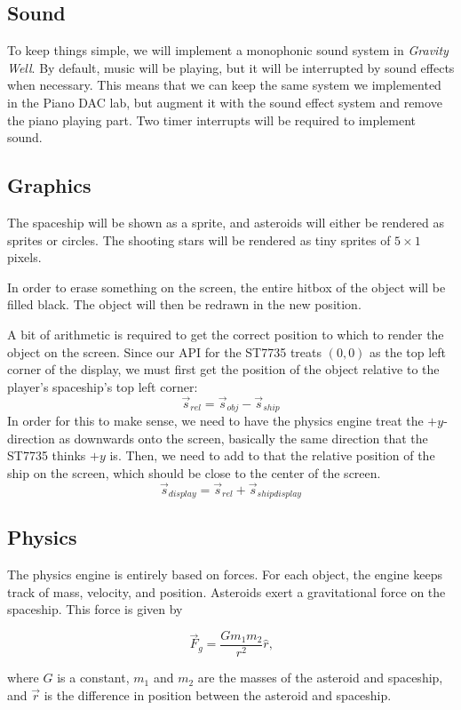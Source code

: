 \documentclass{article}
\def\gamename{Gravity Well}
\def\gametin{\textit{\gamename}}
\begin{document}
\subsection{Sound}

To keep things simple, we will implement a monophonic sound system in \gametin. By default, music will be playing, but
it will be interrupted by sound effects when necessary. This means that we can keep the same system we implemented in the
Piano DAC lab, but augment it with the sound effect system and remove the piano playing part. Two timer interrupts
will be required to implement sound.

\subsection{Graphics}

The spaceship will be shown as a sprite, and asteroids will either be rendered as sprites or circles. The shooting stars
will be rendered as tiny sprites of $5\times1$ pixels.

In order to erase something on the screen, the entire hitbox of the object will be filled black. The object will then be
redrawn in the new position.

A bit of arithmetic is required to get the correct position to which to render the object on the screen. Since our API
for the ST7735 treats $(0,0)$ as the top left corner of the display, we must first get the position of the object relative
to the player's spaceship's top left corner:
$$\vec s_{rel} = \vec s_{obj} - \vec s_{ship}$$
In order for this to make sense, we need to have the physics engine treat the $+y$-direction as downwards onto the screen,
basically the same direction that the ST7735 thinks $+y$ is.
Then, we need to add to that the relative position of the ship on the screen, which should be close to the center of the screen.
$$\vec s_{display} = \vec s_{rel} + \vec s_{shipdisplay}$$

\subsection{Physics}

The physics engine is entirely based on forces. For each object, the engine keeps track of mass, velocity, and position.
Asteroids exert a gravitational force on the spaceship. This force is given by

$$\vec F_g = \frac{Gm_1 m_2}{r^2}\hat r\textrm{,}$$

\noindent where $G$ is a constant, $m_1$ and $m_2$ are the masses of the asteroid and spaceship, and $\vec r$ is the difference in
position between the asteroid and spaceship.
\end{document}
